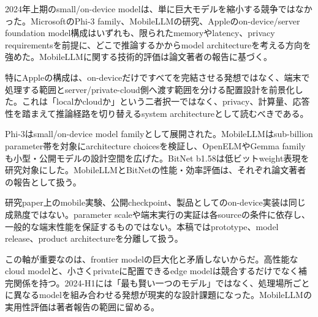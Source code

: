 
2024年上期のsmall/on-device modelは、単に巨大モデルを縮小する競争ではなかった。MicrosoftのPhi-3 family、MobileLLMの研究、Appleのon-device/server foundation model構成はいずれも、限られたmemoryやlatency、privacy requirementsを前提に、どこで推論するかからmodel architectureを考える方向を強めた。MobileLLMに関する技術的評価は論文著者の報告に基づく。\autocite{src-86ea660dfc62,src-c89d38f0e830,src-e78721484043}


特にAppleの構成は、on-deviceだけですべてを完結させる発想ではなく、端末で処理する範囲とserver/private-cloud側へ渡す範囲を分ける配置設計を前景化した。これは「localかcloudか」という二者択一ではなく、privacy、計算量、応答性を踏まえて推論経路を切り替えるsystem architectureとして読むべきである。\autocite{src-c89d38f0e830}


Phi-3はsmall/on-device model familyとして展開された。MobileLLMはsub-billion parameter帯を対象にarchitecture choicesを検証し、OpenELMやGemma familyも小型・公開モデルの設計空間を広げた。BitNet b1.58は低ビットweight表現を研究対象にした。MobileLLMとBitNetの性能・効率評価は、それぞれ論文著者の報告として扱う。\autocite{src-0395647db4a8,src-4d404eabda6e,src-86ea660dfc62,src-e78721484043,src-fb3cf48135e8}


\begin{claimboundary}
研究paper上のmobile実験、公開checkpoint、製品としてのon-device実装は同じ成熟度ではない。parameter scaleや端末実行の実証は各sourceの条件に依存し、一般的な端末性能を保証するものではない。本稿ではprototype、model release、product architectureを分離して扱う。\autocite{src-556c0edcf39c,src-86ea660dfc62,src-c89d38f0e830,src-e78721484043}
\end{claimboundary}

この軸が重要なのは、frontier modelの巨大化と矛盾しないからだ。高性能なcloud modelと、小さくprivateに配置できるedge modelは競合するだけでなく補完関係を持つ。2024-H1には「最も賢い一つのモデル」ではなく、処理場所ごとに異なるmodelを組み合わせる発想が現実的な設計課題になった。MobileLLMの実用性評価は著者報告の範囲に留める。\autocite{src-86ea660dfc62,src-c89d38f0e830,src-e78721484043}
